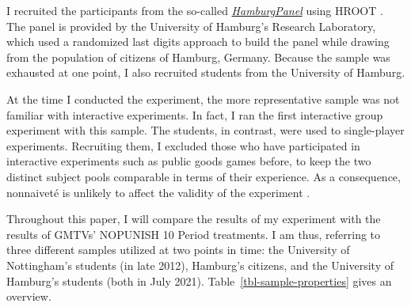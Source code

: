 \documentclass[
  authoryear,
  review,
  3p,
  onecolumn]{elsarticle}
\begin{document}
I recruited the participants from the so-called
\emph{\href{https://www.wiso.uni-hamburg.de/forschung/forschungslabor/umfragelabor/aktuelle-umfragen/hamburgpanel.html}{HamburgPanel}}
using HROOT \citep{hroot}. The panel is provided by the University of
Hamburg's Research Laboratory, which used a randomized last digits
approach to build the panel while drawing from the population of
citizens of Hamburg, Germany. Because the sample was exhausted at one
point, I also recruited students from the University of Hamburg.

At the time I conducted the experiment, the more representative sample
was not familiar with interactive experiments. In fact, I ran the first
interactive group experiment with this sample. The students, in
contrast, were used to single-player experiments. Recruiting them, I
excluded those who have participated in interactive experiments such as
public goods games before, to keep the two distinct subject pools
comparable in terms of their experience. As a consequence, nonnaiveté is
unlikely to affect the validity of the experiment \citep[
p.~204]{GoodmanPaolacci2017}.

Throughout this paper, I will compare the results of my experiment with
the results of GMTVs' NOPUNISH 10 Period treatments. I am thus,
referring to three different samples utilized at two points in time: the
University of Nottingham's students (in late 2012), Hamburg's citizens,
and the University of Hamburg's students (both in July 2021).
Table~\ref{tbl-sample-properties} gives an overview.

\hypertarget{tbl-sample-properties}{}
\begin{table}[!htbp] \centering \renewcommand*{\arraystretch}{1.1}\caption{\label{tbl-sample-properties}Sample Properties }
\end{table}
\end{document}
